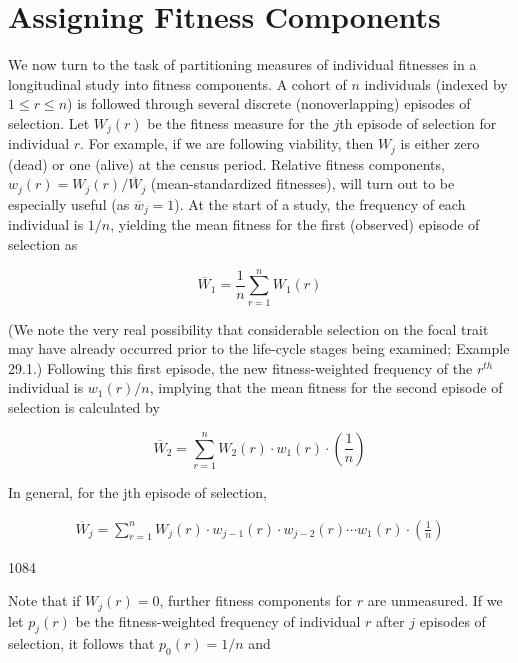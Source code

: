 \documentclass{article}
\begin{document}
\section{Assigning Fitness Components}
We now turn to the task of partitioning measures of individual fitnesses in a longitudinal study into fitness components. A cohort of $n$ individuals (indexed by $1 \leq r \leq n$) is followed through several discrete (nonoverlapping) episodes of selection. Let $W_j(r)$ be the fitness measure for the $j$th episode of selection for individual $r$. For example, if we are following viability, then $W_j$ is either zero (dead) or one (alive) at the census period. Relative fitness components, $w_j(r) = W_j(r)/\overline{W}_j$ (mean-standardized fitnesses), will turn out to be especially useful (as $\overline{w}_j = 1$). At the start of a study, the frequency of each individual is $1/n$, yielding the mean fitness for the first (observed) episode of selection as

\begin{equation}
\overline{W}_{1}=\frac{1}{n}\sum_{r=1}^{n}W_{1}(r)
\tag{29.1a}
\label{eq:29_1a}
\end{equation}

(We note the very real possibility that considerable selection on the focal trait may have already occurred prior to the life-cycle stages being examined; Example 29.1.) Following this first episode, the new fitness-weighted frequency of the  $ r^{th} $ individual is  $ w_{1}(r)/n $, implying that the mean fitness for the second episode of selection is calculated by

\begin{equation}
\overline{W}_{2}=\sum_{r=1}^{n}W_{2}(r)\cdot w_{1}(r)\cdot\left(\frac{1}{n}\right)
\tag{29.1b}
\label{eq:29_1b}
\end{equation}

In general, for the jth episode of selection,

\begin{equation}
\begin{align*}\overline{W}_{j}=\sum_{r=1}^n W_{j}(r)\cdot w_{j-1}(r)\cdot w_{j-2}(r)\cdots w_{1}(r)\cdot\left(\frac{1}{n}\right)\end{align*}
\tag{29.1c}
\label{eq:29_1c}
\end{equation}

1084

Note that if  $ W_j(r) = 0 $, further fitness components for  $ r $ are unmeasured. If we let  $ p_j(r) $ be the fitness-weighted frequency of individual  $ r $ after  $ j $ episodes of selection, it follows that  $ p_0(r) = 1/n $ and
\end{document}
